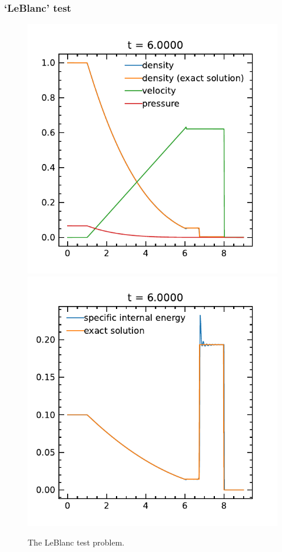 \documentclass[fleqn,usenatbib]{mnras}
\begin{document}
\subsubsection{`LeBlanc' test}
\begin{figure}
    \includegraphics[width=\columnwidth]{hydro_leblanc_6.0000.pdf}
    \includegraphics[width=\columnwidth]{hydro_leblanc_eint_6.0000.pdf}
    \caption{The LeBlanc test problem.}
    \label{fig:leblanc}
\end{figure}
\end{document}
